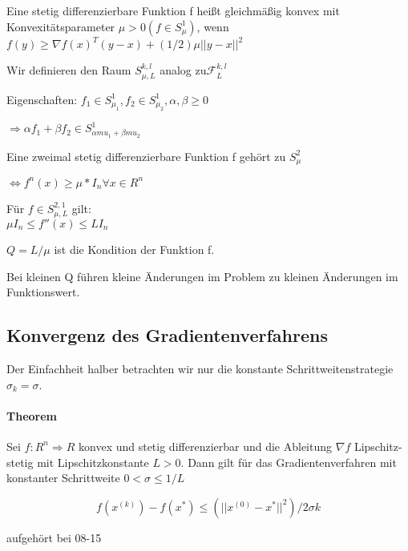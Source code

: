 \begin{Definition}
Eine stetig differenzierbare Funktion f heißt gleichmäßig konvex mit Konvexitätsparameter $\mu > 0 (f \in S_\mu^1)$, wenn $f(y) \geq \nabla f(x)^T (y-x) + (1/2) \mu ||y-x||^2 $
\end{Definition}

Wir definieren den Raum $S_{\mu,L}^{k,l}$ analog zu$ \mathcal{F}_L^{k,l} $

Eigenschaften:
$f_1 \in S_{\mu_1}^1, f_2 \in S_{\mu_2}^1, \alpha, \beta \geq 0 $

$\Rightarrow  \alpha f_1 + \beta f_2 \in S^{1}_{\alpha mu_1 + \beta mu_2}$


\begin{Lemma}
	Eine zweimal stetig differenzierbare Funktion f gehört zu $S^{2}_{\mu}$
\end{Lemma}

$\Leftrightarrow f^n(x) \geq \mu*I_n  \forall x \in R^n$

Für $f \in S_{\mu,L}^{2,1}$ gilt:\\
$\mu I_n \leq f''(x) \leq L I_n$

\begin{Definition}
$Q = L/\mu$ ist die Kondition der Funktion f.
\end{Definition}

Bei kleinen Q führen kleine Änderungen im Problem zu kleinen Änderungen im Funktionswert.
	
\subsection{Konvergenz des Gradientenverfahrens}	

Der Einfachheit halber betrachten wir nur die konstante
Schrittweitenstrategie $\sigma_k = \sigma$.

\paragraph{Theorem}
Sei $f : R^n \Rightarrow R$ konvex und stetig differenzierbar und die Ableitung $\nabla f$
Lipschitz-stetig mit Lipschitzkonstante $L > 0$. Dann gilt für das
Gradientenverfahren mit konstanter Schrittweite $0 < \sigma \leq 1/L$

\begin{equation}
f(x^{(k)}) - f(x^{*}) \leq (||x^{(0)} - x^{*}||^2)/2\sigma k
\end{equation}

aufgehört bei 08-15








